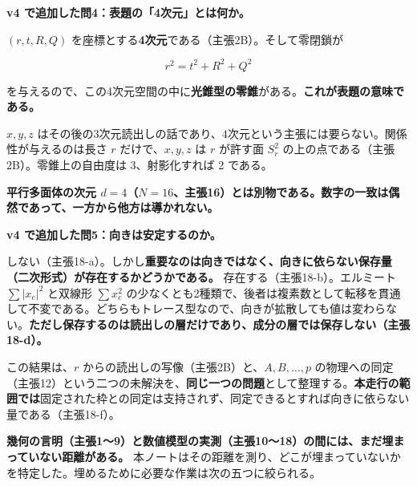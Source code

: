 \documentclass[
  10pt,
]{ltjsarticle}
\begin{document}
\textbf{v4 で追加した問4：表題の「4次元」とは何か。}

\((r, t, R, Q)\)
を座標とする\textbf{4次元}である（主張2B）。そして零閉鎖が

\[r^2 = t^2 + R^2 + Q^2\]

を与えるので、この4次元空間の中に\textbf{光錐型の零錐}がある。\textbf{これが表題の意味である。}

\(x, y, z\)
はその後の3次元読出しの話であり、4次元という主張には要らない。関係性が与えるのは長さ
\(r\) だけで、\(x,y,z\) は \(r\) が許す面 \(S_r^2\)
の上の点である（主張2B）。零錐上の自由度は 3、射影化すれば 2 である。

\textbf{平行多面体の次元
\(d = 4\)（\(N=16\)、主張16）とは別物である。数字の一致は偶然であって、一方から他方は導かれない。}

\textbf{v4 で追加した問5：向きは安定するのか。}

しない（主張18-a）。しかし\textbf{重要なのは向きではなく、向きに依らない保存量（二次形式）が存在するかどうかである。}
存在する（主張18-b）。エルミート \(\sum\lvert x_e\rvert^2\) と双線形
\(\sum x_e^2\)
の少なくとも2種類で、後者は複素数として転移を貫通して不変である。どちらもトレース型なので、向きが拡散しても値は変わらない。\textbf{ただし保存するのは読出しの層だけであり、成分の層では保存しない（主張18-d）。}

この結果は、\(r\) からの読出しの写像（主張2B）と、\(A,B,\dots,p\)
の物理への同定（主張12）という二つの未解決を、\textbf{同じ一つの問題}として整理する。\textbf{本走行の範囲では}固定された枠との同定は支持されず、同定できるとすれば向きに依らない量である（主張18-f）。

\textbf{幾何の言明（主張1〜9）と数値模型の実測（主張10〜18）の間には、まだ埋まっていない距離がある。}
本ノートはその距離を測り、どこが埋まっていないかを特定した。埋めるために必要な作業は次の五つに絞られる。
\end{document}
